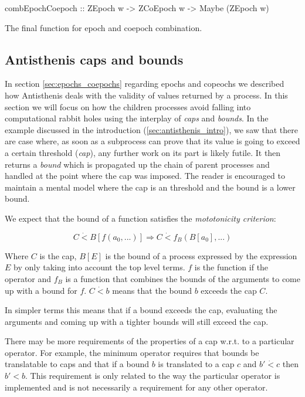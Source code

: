 \begin{code}
\begin{haskellcode}
combEpochCoepoch :: ZEpoch w -> ZCoEpoch w -> Maybe (ZEpoch w)
\end{haskellcode}
  \caption{\label{lst:comb_epoch_coepoch}The final function for epoch
    and coepoch combination.}
\end{code}

\subsection{Antisthenis caps and bounds}
\label{sec:caps_and_bounds}

In section \ref{sec:epochs_coepochs} regarding epochs and copeochs we
described how Antisthenis deals with the validity of values returned
by a process. In this section we will focus on how the children
processes avoid falling into computational rabbit holes using the
interplay of \emph{caps} and \emph{bounds}.  In the example discussed
in the introduction (\ref{sec:antisthenis_intro}), we saw that there
are case where, as soon as a subprocess can prove that its value is
going to exceed a certain threshold (\emph{cap}), any further work on
its part is likely futile. It then returns a \emph{bound} which is
propagated up the chain of parent processes and handled at the point
where the cap was imposed. The reader is encouraged to maintain a
mental model where the cap is an threshold and the bound is a lower
bound.

We expect that the bound of a function satisfies the
\emph{mototonicity criterion}:

\[
C \dot{<} B[ f(a_0, ...)] \Rightarrow C \dot{<} f_B(B[a_0],...)
\]

Where \(C\) is the cap, \(B[E]\) is the bound of a process expressed
by the expression \(E\) by only taking into account the top level
terms. \(f\) is the function if the operator and \(f_B\) is a function
that combines the bounds of the arguments to come up with a bound for
\(f\). \(C \dot{<} b\) means that the bound \(b\) exceeds the cap
\(C\).

In simpler terms this means that if a bound exceeds the cap,
evaluating the arguments and coming up with a tighter bounds will
still exceed the cap.

There may be more requirements of the properties of a cap w.r.t. to a
particular operator. For example, the minimum operator requires that
bounds be translatable to caps and that if a bound \(b\) is translated
to a cap \(c\) and \(b' \dot{<} c\) then \(b' < b\). This requirement
is only related to the way the particular operator is implemented and
is not necessarily a requirement for any other operator.


